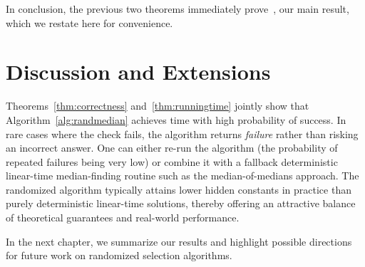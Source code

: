 In conclusion, the previous two theorems immediately prove~, our main result, which we restate here for convenience.
\mainTheoremCommand*

\section*{Discussion and Extensions}

Theorems~\ref{thm:correctness} and~\ref{thm:runningtime} jointly show that Algorithm~\ref{alg:randmedian} achieves  time with high probability of success. In rare cases where the check fails, the algorithm returns \emph{failure} rather than risking an incorrect answer. One can either re-run the algorithm (the probability of repeated failures being very low) or combine it with a fallback deterministic linear-time median-finding routine such as the median-of-medians approach. The randomized algorithm typically attains lower hidden constants in practice than purely deterministic linear-time solutions, thereby offering an attractive balance of theoretical guarantees and real-world performance.

In the next chapter, we summarize our results and highlight possible directions for future work on randomized selection algorithms.
